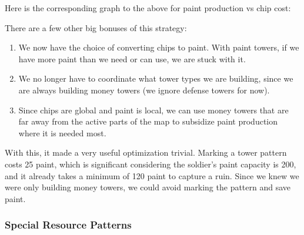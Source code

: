 \medskip

Here is the corresponding graph to the above for paint production vs chip cost:
\begin{center}
\end{center}
There are a few other big bonuses of this strategy:
\begin{enumerate}
  \item We now have the choice of converting chips to paint. With paint towers, if we have more paint than we need or can use, we are stuck with it.
  \item We no longer have to coordinate what tower types we are building, since we are always building money towers (we ignore defense towers for now).
  \item Since chips are global and paint is local, we can use money towers that are far away from the active parts of the map to subsidize paint production where it is needed most.
\end{enumerate}
With this, it made a very useful optimization trivial. Marking a tower pattern costs 25 paint, which is significant considering the soldier's paint capacity is 200, and it already takes a minimum of 120 paint to capture a ruin. Since we knew we were only building money towers, we could avoid marking the pattern and save paint.

\subsubsection{Special Resource Patterns}

